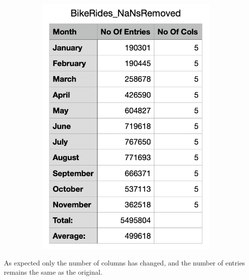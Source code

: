 \documentclass[12pt]{article}
\begin{document}
\begin{itemize}
\begin{figure}[h]
\begin{subfigure}{.4\textwidth}
		\includegraphics[scale=0.5]{img4.png}
	\end{subfigure}
	\end{figure}
	As expected only the number of columns has changed, and the number of entries remains the same as the original. 
		
\end{itemize} 
\end{document}
